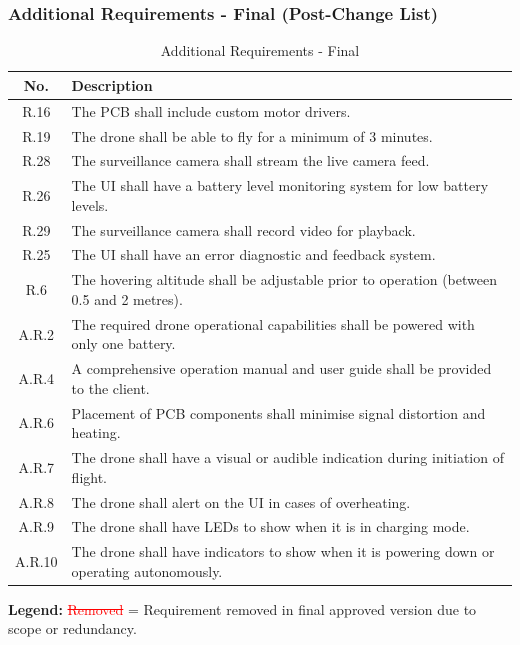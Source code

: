 \subsubsection{Additional Requirements - Final (Post-Change List)}

\begin{table}[H]
\centering
\caption{Additional Requirements - Final}
\begin{tabular}{|c|p{11cm}|}
\hline
\textbf{No.} & \textbf{Description} \\ \hline
R.16 & The PCB shall include custom motor drivers. \\ \hline
R.19 & The drone shall be able to fly for a minimum of 3 minutes. \\ \hline
R.28 & The surveillance camera shall stream the live camera feed. \\ \hline
R.26 & The UI shall have a battery level monitoring system for low battery levels. \\ \hline
R.29 & The surveillance camera shall record video for playback. \\ \hline
R.25 & The UI shall have an error diagnostic and feedback system. \\ \hline
R.6 & The hovering altitude shall be adjustable prior to operation (between 0.5 and 2 metres). \\ \hline
A.R.2 & The required drone operational capabilities shall be powered with only one battery. \\ \hline
A.R.4 & A comprehensive operation manual and user guide shall be provided to the client. \\ \hline
A.R.6 & Placement of PCB components shall minimise signal distortion and heating. \\ \hline
A.R.7 & The drone shall have a visual or audible indication during initiation of flight. \\ \hline
A.R.8 & The drone shall alert on the UI in cases of overheating. \\ \hline
A.R.9 & The drone shall have LEDs to show when it is in charging mode. \\ \hline
A.R.10 & The drone shall have indicators to show when it is powering down or operating autonomously. \\ \hline
\end{tabular}
\end{table}

\textbf{Legend:}  
\textcolor{red}{\sout{Removed}} = Requirement removed in final approved version due to scope or redundancy.
\pagebreak
